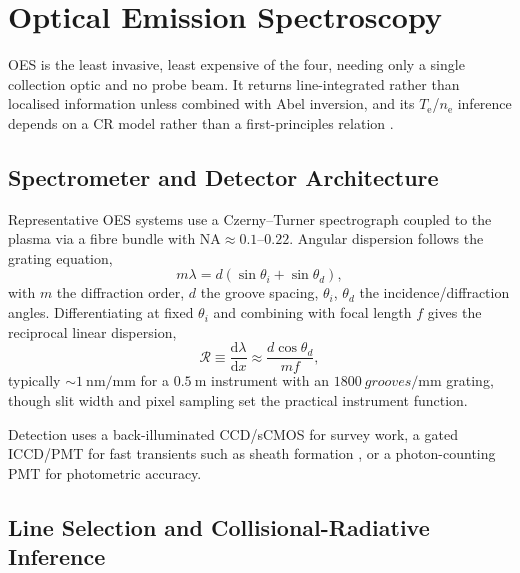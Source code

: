 \section{Optical Emission Spectroscopy}
\label{sec:specs-oes}

OES is the least invasive, least expensive of the four, needing only a single collection optic and no probe beam. It returns line-integrated rather than localised information unless combined with Abel inversion, and its $T_{\mathrm{e}}$/$n_{\mathrm{e}}$ inference depends on a CR model rather than a first-principles relation \cite{ref0231,ref0237}.

\subsection{Spectrometer and Detector Architecture}

Representative OES systems use a Czerny--Turner spectrograph coupled to the plasma via a fibre bundle with $\mathrm{NA} \approx 0.1$--$0.22$. Angular dispersion follows the grating equation,
\begin{equation}
m \lambda = d \left( \sin\theta_{i} + \sin\theta_{d} \right) ,
\label{eq:specs-grating}
\end{equation}
with $m$ the diffraction order, $d$ the groove spacing, $\theta_{i}$, $\theta_{d}$ the incidence/diffraction angles. Differentiating at fixed $\theta_{i}$ and combining with focal length $f$ gives the reciprocal linear dispersion,
\begin{equation}
\mathcal{R} \equiv \frac{\mathrm{d}\lambda}{\mathrm{d}x} \approx \frac{d \cos\theta_{d}}{m f} ,
\label{eq:specs-dispersion}
\end{equation}
typically $\sim\SI{1}{\nano\meter\per\milli\meter}$ for a $\SI{0.5}{\meter}$ instrument with an $\SI{1800}{grooves\per\milli\meter}$ grating, though slit width and pixel sampling set the practical instrument function.

Detection uses a back-illuminated CCD/sCMOS for survey work, a gated ICCD/PMT for fast transients such as sheath formation \cite{ref0256}, or a photon-counting PMT for photometric accuracy.

\subsection{Line Selection and Collisional-Radiative Inference}

